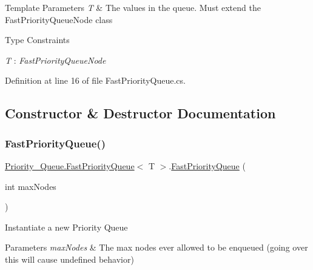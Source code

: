 \begin{DoxyTemplParams}{Template Parameters}
{\em T} & The values in the queue. Must extend the Fast\+Priority\+Queue\+Node class\\
\hline
\end{DoxyTemplParams}
\begin{Desc}
\item[Type Constraints]\begin{description}
\item[{\em T} : {\em Fast\+Priority\+Queue\+Node}]\end{description}
\end{Desc}


Definition at line 16 of file Fast\+Priority\+Queue.\+cs.



\subsection{Constructor \& Destructor Documentation}
\mbox{\label{class_priority___queue_1_1_fast_priority_queue_a9b36491841ecaf15f8253a14a4050e0b}} 
\subsubsection{\texorpdfstring{Fast\+Priority\+Queue()}{FastPriorityQueue()}}
{\footnotesize\ttfamily \hyperlink{class_priority___queue_1_1_fast_priority_queue}{Priority\+\_\+\+Queue.\+Fast\+Priority\+Queue}$<$ T $>$.\hyperlink{class_priority___queue_1_1_fast_priority_queue}{Fast\+Priority\+Queue} (\begin{DoxyParamCaption}\item[{int}]{max\+Nodes }\end{DoxyParamCaption})}



Instantiate a new Priority Queue 


\begin{DoxyParams}{Parameters}
{\em max\+Nodes} & The max nodes ever allowed to be enqueued (going over this will cause undefined behavior)\\
\hline
\end{DoxyParams}


